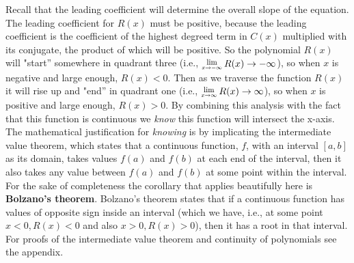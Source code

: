 \documentclass[12pt]{article}
\newcommand{\Lim}[1]{\raisebox{0.5ex}{\scalebox{0.8}{$\displaystyle \lim_{#1}\;$}}}
\begin{document}
\begin{wrapfigure}{r}{8cm}
\end{wrapfigure}

Recall that the leading coefficient will determine the overall slope of the equation.  The leading coefficient for $R(x)$ must be positive, because the leading coefficient is the coefficient of the highest degreed term in $C(x)$ multiplied with its conjugate, the product of which will be positive.  So the polynomial $R(x)$ will "start'' somewhere in quadrant three (i.e., $\Lim{x \rightarrow -\infty} R(x) \rightarrow -\infty$), so when $x$ is negative and large enough, $R(x)<0$.  Then as we traverse the function $R(x)$ it will rise up and "end'' in quadrant one (i.e., $\Lim{x \rightarrow \infty} R(x) \rightarrow \infty$), so when $x$ is positive and large enough, $R(x)>0$.  By combining this analysis with the fact that this function is continuous we \emph{know} this function will intersect the x-axis.  The mathematical justification for \emph{knowing} is by implicating the intermediate value theorem, which states that a continuous function, $f$, with an interval $[a,b]$ as its domain, takes values $f(a)$ and $f(b)$ at each end of the interval, then it also takes any value between $f(a)$ and $f(b)$ at some point within the interval.  For the sake of completeness the corollary that applies beautifully here is \textbf{Bolzano's theorem}.  Bolzano's theorem states that if a continuous function has values of opposite sign inside an interval (which we have, i.e., at some point $x<0, R(x)<0$ and also $x>0, R(x)>0$), then it has a root in that interval.  For proofs of the intermediate value theorem and continuity of polynomials see the appendix.
\end{document}
